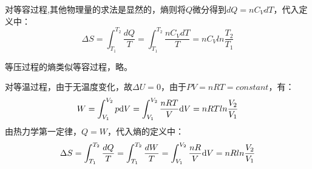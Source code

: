 \documentclass{Physics_H_Notes}
\begin{document}
        \begin{prove}
            对等容过程,其他物理量的求法是显然的，熵则将$Q$微分得到$dQ = nC_{V}dT$，代入定义中：
            \begin{equation}
                \Delta S = \int_{T_1}^{T_2} \frac{dQ}{T} = \int_{T_1}^{T_2} \frac{nC_{V}dT}{T} = nC_{V}ln\frac{T_2}{T_1}
            \end{equation}
            
            等压过程的熵类似等容过程，略。
        \end{prove}
        \begin{prove}
            对等温过程，由于无温度变化，故$\Delta U = 0$，由于$PV = nRT = constant$，有：
            \begin{equation}
                W = \int_{V_1}^{V_2} p \mathrm{d}{V} = \int_{V_1}^{V_2} \frac{nRT}{V} \mathrm{d}{V} = nRTln\frac{V_2}{V_1}
            \end{equation}
            由热力学第一定律，$Q = W$，代入熵的定义中：
            \begin{equation}
                \Delta S = \int_{T_1}^{T_2} \frac{dQ}{T} =\int_{T_1}^{T_2} \frac{dW}{T} =  \int_{V_1}^{V_2} \frac{nR}{V} \mathrm{d}{V} = nRln\frac{V_2}{V_1}
            \end{equation} 
        \end{prove}
\end{document}

